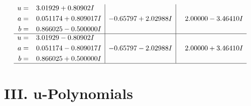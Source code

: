 \documentclass[1p]{elsarticle_modified}
\theoremstyle{definition}
\begin{document}
$$\begin{array}{c|c|c}
\begin{aligned}
u &= \phantom{-}3.01929 + 0.80902 I \\
a &= \phantom{-}0.051174 + 0.809017 I \\
b &= \phantom{-}0.866025 - 0.500000 I\end{aligned}
 & -0.65797 + 2.02988 I & \phantom{-}2.00000 - 3.46410 I \\ \hline\begin{aligned}
u &= \phantom{-}3.01929 - 0.80902 I \\
a &= \phantom{-}0.051174 - 0.809017 I \\
b &= \phantom{-}0.866025 + 0.500000 I\end{aligned}
 & -0.65797 - 2.02988 I & \phantom{-}2.00000 + 3.46410 I\\
 \hline 
 \end{array}$$\newpage
\newpage\renewcommand{\arraystretch}{1}
\centering \section*{ III. u-Polynomials}
\end{document}
